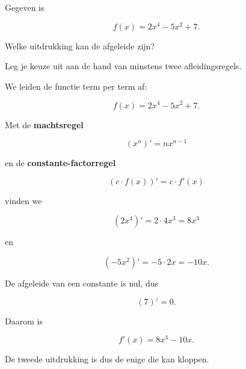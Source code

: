 \documentclass{ximera}
\begin{document}
\begin{oefening}{\oefU \ESS}

Gegeven is

\[
f(x)=2x^4-5x^2+7.
\]

Welke uitdrukking kan de afgeleide zijn?

\begin{multipleChoice}





\end{multipleChoice}

Leg je keuze uit aan de hand van minstens twee afleidingsregels.

\begin{oplossing}

  We leiden de functie term per term af:
  
  \[
  f(x)=2x^4-5x^2+7.
  \]
  
  Met de \textbf{machtsregel}
  
  \[
  (x^n)'=nx^{n-1}
  \]
  
  en de \textbf{constante-factorregel}
  
  \[
  (c\cdot f(x))'=c\cdot f'(x)
  \]
  
  vinden we
  
  \[
  (2x^4)'=2\cdot 4x^3=8x^3
  \]
  
  en
  
  \[
  (-5x^2)'=-5\cdot 2x=-10x.
  \]
  
  De afgeleide van een constante is nul, dus
  
  \[
  (7)'=0.
  \]
  
  Daarom is
  
  \[
  \boxed{f'(x)=8x^3-10x}.
  \]
  
  De tweede uitdrukking is dus de enige die kan kloppen.
  
  \end{oplossing}

\end{oefening}



\end{document}
